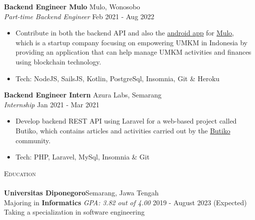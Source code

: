 \documentclass[a4paper]{article}
\newcommand{\lineunder} {
    \vspace*{-8pt} \\
    \hspace*{-18pt} \hrulefill \\
}
\newcommand{\header} [1] {
    {\hspace*{-18pt}\vspace*{6pt} \textsc{#1}}
    \vspace*{-6pt} \lineunder
}
\begin{document}
\textbf{Backend Engineer Mulo} \hfill Mulo, Wonosobo\\
\textit{Part-time Backend Engineer} \hfill Feb 2021 - Aug 2022\\
\vspace{-1mm}
\begin{itemize} \itemsep 1pt
	\item Contribute in both the backend API and also the \href{https://play.google.com/store/apps/details?id=app.mulo}{android app} for \href{https://muloapp.id/}{Mulo}, which is a startup company focusing on empowering UMKM in Indonesia by providing an application that can help manage UMKM activities and finances using blockchain technology.
	\item Tech: NodeJS, SailsJS, Kotlin, PostgreSql, Insomnia, Git \& Heroku
\end{itemize}

\textbf{Backend Engineer Intern} \hfill Azura Labs, Semarang\\
\textit{Internship} \hfill Jan 2021 - Mar 2021\\
\vspace{-1mm}
\begin{itemize} \itemsep 1pt
	\item Develop backend REST API using Laravel for a web-based project called \textquotesingle{}Butiko\textquotesingle{}, which contains articles and activities carried out by the \textquotesingle{}\href{https://butiko.id/}{Butiko}\textquotesingle{} community.
	\item Tech: PHP, Laravel, MySql, Insomnia \& Git
\end{itemize}


\header{Education}
\textbf{Universitas Diponegoro}\hfill Semarang, Jawa Tengah\\
Majoring in \textbf{Informatics} \textit{GPA: 3.82 out of 4.00} \hfill 2019 - August 2023 (Expected)\\
Taking a specialization in software engineering
\vspace{2mm}
\end{document}
